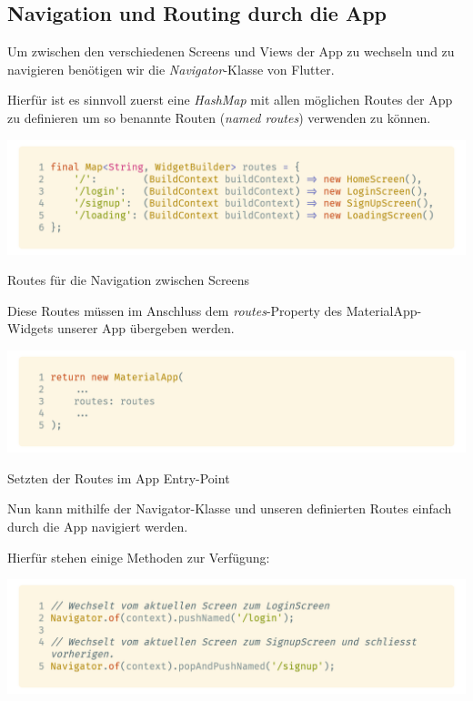 \subsection{Navigation und Routing durch die App}

Um zwischen den verschiedenen Screens und Views der App zu wechseln und zu navigieren benötigen wir die \textit{Navigator}-Klasse von Flutter.

Hierfür ist es sinnvoll zuerst eine \textit{HashMap} mit allen möglichen Routes der App zu definieren
um so benannte Routen (\textit{named routes}) verwenden zu können.

\begin{code}
    \centering
    \includegraphics[width=1\textwidth]{images/Flutter/flutterRoutes.png}
    \caption{Routes für die Navigation zwischen Screens}
\end{code}

\newpage

Diese Routes müssen im Anschluss dem \textit{routes}-Property des MaterialApp-Widgets unserer App übergeben werden.

\begin{code}
    \centering
    \includegraphics[width=1\textwidth]{images/Flutter/flutterMainRoute.png}
    \caption{Setzten der Routes im App Entry-Point}
\end{code}

Nun kann mithilfe der Navigator-Klasse und unseren definierten Routes einfach durch die App navigiert werden.

Hierfür stehen einige Methoden zur Verfügung:

\begin{code}
    \centering
    \includegraphics[width=1\textwidth]{images/Flutter/flutterNavigatorOf.png}
    \caption{\lstinline{Navigator.of()}-Funktion zum Wechseln der Screens per \textit{namedRoutes}}
\end{code}

